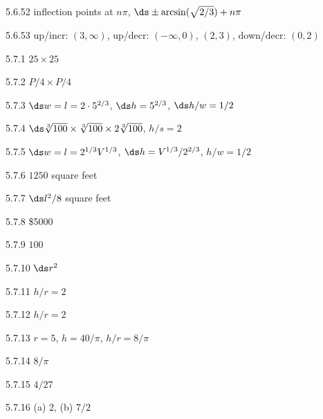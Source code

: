 \begin{Answer}{5.6.52}
 inflection points at $n\pi$, $\ds \pm\arcsin(\sqrt{2/3})+n\pi$
\end{Answer}
\begin{Answer}{5.6.53}
 up/incr: $(3,\infty)$, up/decr: $(-\infty,0)$, $(2,3)$,
down/decr: $(0,2)$
\end{Answer}
\begin{Answer}{5.7.1}
 $25\times 25$
\end{Answer}
\begin{Answer}{5.7.2}
 $P/4\times P/4$
\end{Answer}
\begin{Answer}{5.7.3}
 $\ds w=l=2\cdot 5^{2/3}$, $\ds h=5^{2/3}$, $\ds h/w=1/2$
\end{Answer}
\begin{Answer}{5.7.4}
 $\ds \root 3\of {100}\times\root 3\of {100}\times 2\root 3\of
{100}$, $h/s=2$
\end{Answer}
\begin{Answer}{5.7.5}
 $\ds w=l=2^{1/3}V^{1/3}$, $\ds h=V^{1/3}/2^{2/3}$, $h/w=1/2$
\end{Answer}
\begin{Answer}{5.7.6}
 $1250$ square feet
\end{Answer}
\begin{Answer}{5.7.7}
 $\ds l^2/8$ square feet
\end{Answer}
\begin{Answer}{5.7.8}
 \$5000
\end{Answer}
\begin{Answer}{5.7.9}
 $100$
\end{Answer}
\begin{Answer}{5.7.10}
 $\ds r^2$
\end{Answer}
\begin{Answer}{5.7.11}
 $h/r=2$
\end{Answer}
\begin{Answer}{5.7.12}
 $h/r=2$
\end{Answer}
\begin{Answer}{5.7.13}
 $r=5$, $h=40/\pi$, $h/r=8/\pi$
\end{Answer}
\begin{Answer}{5.7.14}
 $8/\pi$
\end{Answer}
\begin{Answer}{5.7.15}
 $4/27$
\end{Answer}
\begin{Answer}{5.7.16}
 (a) 2, (b) $7/2$
\end{Answer}
